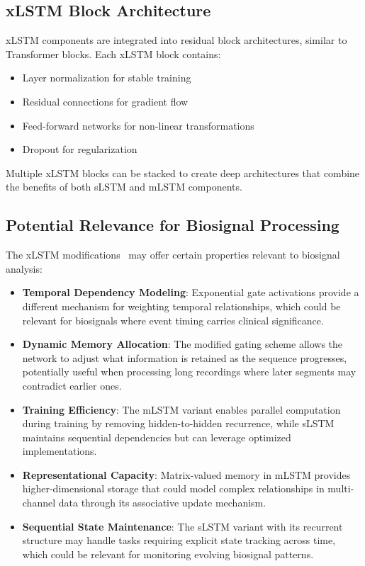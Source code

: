 \subsection{xLSTM Block Architecture}

\ac{xLSTM} components are integrated into residual block architectures, similar to Transformer blocks. Each \ac{xLSTM} block contains:

\begin{itemize}
    \item Layer normalization for stable training
    \item Residual connections for gradient flow
    \item Feed-forward networks for non-linear transformations
    \item Dropout for regularization
\end{itemize}

Multiple \ac{xLSTM} blocks can be stacked to create deep architectures that combine the benefits of both \ac{sLSTM} and \ac{mLSTM} components.

\subsection{Potential Relevance for Biosignal Processing}

The xLSTM modifications~\cite{beck2024xlstm} may offer certain properties relevant to biosignal analysis:

\begin{itemize}
    \item \textbf{Temporal Dependency Modeling}: Exponential gate activations provide a different mechanism for weighting temporal relationships, which could be relevant for biosignals where event timing carries clinical significance.
    
    \item \textbf{Dynamic Memory Allocation}: The modified gating scheme allows the network to adjust what information is retained as the sequence progresses, potentially useful when processing long recordings where later segments may contradict earlier ones.
    
    \item \textbf{Training Efficiency}: The \ac{mLSTM} variant enables parallel computation during training by removing hidden-to-hidden recurrence, while \ac{sLSTM} maintains sequential dependencies but can leverage optimized implementations.
    
    \item \textbf{Representational Capacity}: Matrix-valued memory in \ac{mLSTM} provides higher-dimensional storage that could model complex relationships in multi-channel data through its associative update mechanism.
    
    \item \textbf{Sequential State Maintenance}: The \ac{sLSTM} variant with its recurrent structure may handle tasks requiring explicit state tracking across time, which could be relevant for monitoring evolving biosignal patterns.
\end{itemize}


